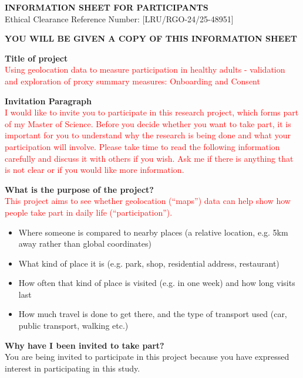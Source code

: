 \documentclass[12pt]{article}
\newcommand{\chg}[1]{\textcolor{red}{#1}}
\begin{document}
\begin{center}
  {\Large \textbf{INFORMATION SHEET FOR PARTICIPANTS}}\\[0.5em]
  {\small Ethical Clearance Reference Number: [LRU/RGO-24/25-48951]}
\end{center}

\vspace{0.5em}
\textbf{YOU WILL BE GIVEN A COPY OF THIS INFORMATION SHEET}

\vspace{1em}
\noindent\textbf{Title of project}\\
\chg{Using geolocation data to measure participation in healthy adults - validation and exploration of proxy summary measures: Onboarding and Consent}

\vspace{1.25em}
\noindent\textbf{Invitation Paragraph}\\
\chg{I would like to invite you to participate in this research project, which forms part of my Master of Science. Before you decide whether you want to take part, it is important for you to understand why the research is being done and what your participation will involve. Please take time to read the following information carefully and discuss it with others if you wish. Ask me if there is anything that is not clear or if you would like more information.}

\vspace{1.25em}
\noindent\textbf{What is the purpose of the project?}\\
\chg{This project aims to see whether geolocation (``maps'') data can help show how people take part in daily life (``participation'').}

\begin{itemize}[leftmargin=1.2em]
  \item Where someone is compared to nearby places (a relative location, e.g. 5km away rather than global coordinates)
  \item What kind of place it is (e.g. park, shop, residential address, restaurant)
  \item How often that kind of place is visited (e.g. in one week) and how long visits last
  \item How much travel is done to get there, and the type of transport used (car, public transport, walking etc.)
\end{itemize}

\vspace{1.25em}
\noindent\textbf{Why have I been invited to take part?}\\
You are being invited to participate in this project because you have expressed interest in participating in this study.
\end{document}
